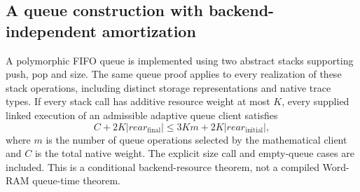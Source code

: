 \begin{result}
\subsection{A queue construction with backend-independent amortization}
A polymorphic FIFO queue is implemented using two abstract stacks supporting push, pop and size.
The same queue proof applies to every realization of these stack operations, including distinct
storage representations and native trace types. If every stack call has additive resource weight
at most $K$, every supplied linked execution of an admissible adaptive queue client satisfies
\[
 C+2K|\mathit{rear}_{\mathrm{final}}|
 \le 3Km+2K|\mathit{rear}_{\mathrm{initial}}|,
\]
where $m$ is the number of queue operations selected by the mathematical client and $C$ is the
total native weight. The explicit size call and empty-queue cases are included. This is a
conditional backend-resource theorem, not a compiled Word-RAM queue-time theorem.
\citep[Exercise 10.1-6 and Chapter 17]{CLRS2009}
\end{result}

